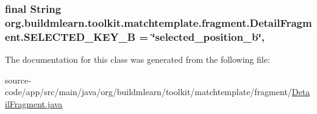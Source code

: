 \subsubsection[{\texorpdfstring{S\+E\+L\+E\+C\+T\+E\+D\+\_\+\+K\+E\+Y\+\_\+B}{SELECTED_KEY_B}}]{\setlength{\rightskip}{0pt plus 5cm}final String org.\+buildmlearn.\+toolkit.\+matchtemplate.\+fragment.\+Detail\+Fragment.\+S\+E\+L\+E\+C\+T\+E\+D\+\_\+\+K\+E\+Y\+\_\+B = \char`\"{}selected\+\_\+position\+\_\+b\char`\"{}\hspace{0.3cm}{\ttfamily [static]}, {\ttfamily [private]}}\hypertarget{classorg_1_1buildmlearn_1_1toolkit_1_1matchtemplate_1_1fragment_1_1DetailFragment_a78671b094425c1174bfb14f43af55f3b}{}\label{classorg_1_1buildmlearn_1_1toolkit_1_1matchtemplate_1_1fragment_1_1DetailFragment_a78671b094425c1174bfb14f43af55f3b}


The documentation for this class was generated from the following file\+:\begin{DoxyCompactItemize}
\item 
source-\/code/app/src/main/java/org/buildmlearn/toolkit/matchtemplate/fragment/\hyperlink{DetailFragment_8java}{Detail\+Fragment.\+java}\end{DoxyCompactItemize}
